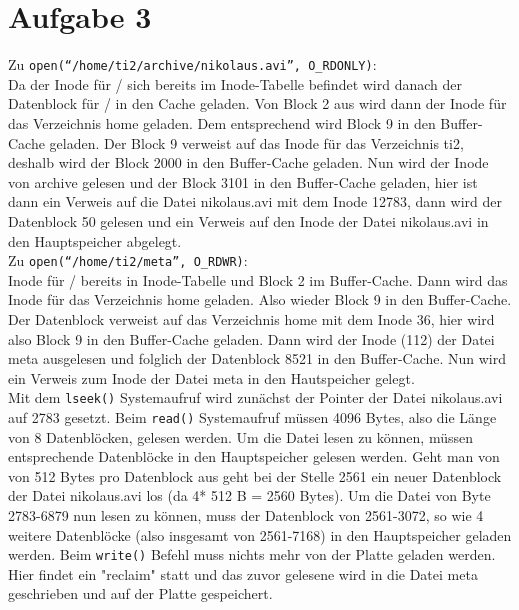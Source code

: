 \documentclass{ti2}
\begin{document}
\section*{Aufgabe 3}

Zu \texttt{open(``/home/ti2/archive/nikolaus.avi'', O\_RDONLY)}:\\

Da der Inode für / sich bereits im Inode-Tabelle befindet 
wird danach der Datenblock für / in den Cache geladen. Von Block 2
aus wird dann der Inode für das Verzeichnis home geladen. Dem 
entsprechend wird Block 9 in den Buffer-Cache geladen. Der Block 9 
verweist auf das Inode für das Verzeichnis ti2, deshalb wird der
Block 2000 in den Buffer-Cache geladen. Nun wird der Inode von 
archive gelesen und der Block 3101 in den Buffer-Cache geladen,
hier ist dann ein Verweis auf die Datei nikolaus.avi mit dem Inode
12783, dann wird der Datenblock 50 gelesen und ein Verweis auf den
Inode der Datei nikolaus.avi in den Hauptspeicher abgelegt.\\

Zu \texttt{open(``/home/ti2/meta'', O\_RDWR)}:\\

Inode für / bereits in Inode-Tabelle und Block 2 im Buffer-Cache.
Dann wird das Inode für das Verzeichnis home geladen. Also wieder 
Block 9 in den Buffer-Cache. Der Datenblock verweist auf das Verzeichnis
home mit dem Inode 36, hier wird also Block 9 in den Buffer-Cache 
geladen. Dann wird der Inode (112) der Datei meta ausgelesen und 
folglich der Datenblock 8521 in den Buffer-Cache. Nun wird
ein Verweis zum Inode der Datei meta in den Hautspeicher gelegt.\\

Mit dem \texttt{lseek()} Systemaufruf wird zunächst der Pointer der Datei nikolaus.avi auf 2783 gesetzt. Beim \texttt{read()} Systemaufruf müssen 4096 Bytes, also die Länge von 8 Datenblöcken, gelesen werden. Um die Datei lesen zu können, müssen entsprechende Datenblöcke in den Hauptspeicher gelesen werden. Geht man von von 512 Bytes pro Datenblock aus geht bei der Stelle 2561 ein neuer Datenblock der Datei nikolaus.avi los (da 4* 512 B = 2560 Bytes). Um die Datei von Byte 2783-6879 nun lesen zu können, muss der Datenblock von 2561-3072, so wie 4 weitere Datenblöcke (also insgesamt von 2561-7168) in den Hauptspeicher geladen werden. Beim \texttt{write()} Befehl muss nichts mehr von der Platte geladen werden. Hier findet ein "reclaim" statt und das zuvor gelesene wird in die Datei meta geschrieben und auf der Platte gespeichert.
\end{document}
